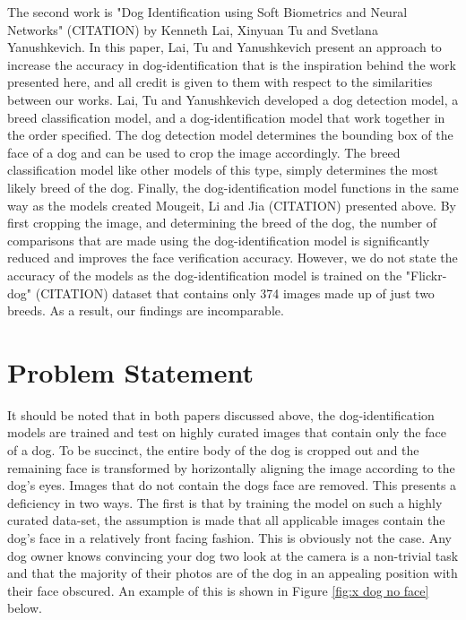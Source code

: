 \documentclass{article}
\begin{document}
	The second work is "Dog Identification using Soft Biometrics and Neural Networks" (CITATION) by Kenneth Lai, Xinyuan Tu and Svetlana Yanushkevich.  In this paper, Lai, Tu and Yanushkevich present an approach to increase the accuracy in dog-identification that is the inspiration behind the work presented here, and all credit is given to them with respect to the similarities between our works.  Lai, Tu and Yanushkevich developed a dog detection model, a breed classification model, and a dog-identification model that work together in the order specified.   The dog detection model determines the bounding box of the face of a dog and can be used to crop the image accordingly.  The breed classification model like other models of this type, simply determines the most likely breed of the dog.  Finally, the dog-identification model functions in the same way as the models created  Mougeit, Li and Jia (CITATION) presented above.  By first cropping the image, and determining the breed of the dog, the number of comparisons that are made using the dog-identification model is significantly reduced and improves the face verification accuracy.  However, we do not state the accuracy of the models as the dog-identification model is trained on the "Flickr-dog" (CITATION) dataset that contains only 374 images made up of just two breeds.  As a result, our findings are incomparable.

\section{Problem Statement}
	It should be noted that in both papers discussed above, the dog-identification models are trained and test on highly curated images that contain only the face of a dog.  To be succinct, the entire body of the dog is cropped out and the remaining face is transformed by horizontally aligning the image according to the dog's eyes.  Images that do not contain the dogs face are removed.  This presents a deficiency in two ways.  The first is that by training the model on such a highly curated data-set, the assumption is made that all applicable images contain the dog's face in a relatively front facing fashion.  This is obviously not the case.  Any dog owner knows convincing your dog two look at the camera is a non-trivial task and that the majority of their photos are of the dog in an appealing position with their face obscured.  An example of this is shown in Figure \ref{fig:x dog no face} below.  
\end{document}
